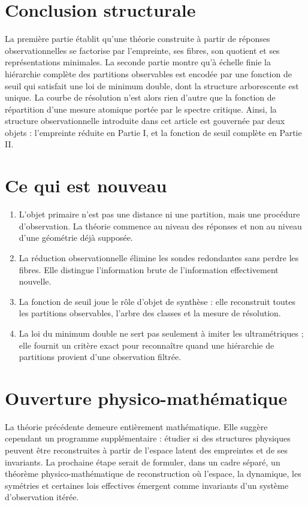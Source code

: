 \documentclass[11pt,a4paper,openany]{book}
\begin{document}
\section{Conclusion structurale}

La première partie établit qu'une théorie construite à partir de réponses observationnelles se factorise par l'empreinte, ses fibres, son quotient et ses représentations minimales. La seconde partie montre qu'à échelle finie la hiérarchie complète des partitions observables est encodée par une fonction de seuil qui satisfait une loi de minimum double, dont la structure arborescente est unique. La courbe de résolution n'est alors rien d'autre que la fonction de répartition d'une mesure atomique portée par le spectre critique. Ainsi, la structure observationnelle introduite dans cet article est gouvernée par deux objets : l'empreinte réduite en Partie I, et la fonction de seuil complète en Partie II.

\section{Ce qui est nouveau}

\begin{enumerate}[label=\arabic*.]
\item L'objet primaire n'est pas une distance ni une partition, mais une procédure d'observation. La théorie commence au niveau des réponses et non au niveau d'une géométrie déjà supposée.
\item La réduction observationnelle élimine les sondes redondantes sans perdre les fibres. Elle distingue l'information brute de l'information effectivement nouvelle.
\item La fonction de seuil joue le rôle d'objet de synthèse : elle reconstruit toutes les partitions observables, l'arbre des classes et la mesure de résolution.
\item La loi du minimum double ne sert pas seulement à imiter les ultramétriques ; elle fournit un critère exact pour reconnaître quand une hiérarchie de partitions provient d'une observation filtrée.
\end{enumerate}

\section{Ouverture physico-mathématique}

La théorie précédente demeure entièrement mathématique. Elle suggère cependant un programme supplémentaire : étudier si des structures physiques peuvent être reconstruites à partir de l'espace latent des empreintes et de ses invariants. La prochaine étape serait de formuler, dans un cadre séparé, un théorème physico-mathématique de reconstruction où l'espace, la dynamique, les symétries et certaines lois effectives émergent comme invariants d'un système d'observation itérée.
\end{document}
